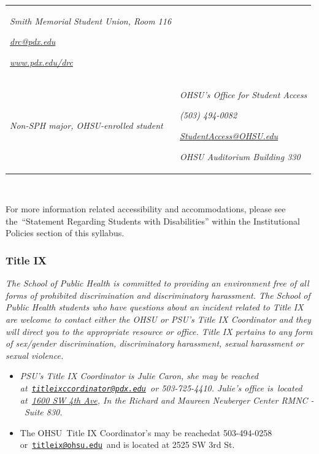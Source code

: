\documentclass[
  letterpaper,
  DIV=11,
  numbers=noendperiod]{scrartcl}
\begin{document}
\begin{longtable}[]{@{}
  >{\raggedright\arraybackslash}p{}
  >{\raggedright\arraybackslash}p{}@{}}
\emph{Smith Memorial Student Union, Room 116}

\href{mailto:drc@pdx.edu}{\emph{drc@pdx.edu}}

\href{http://www.pdx.edu/drc}{\emph{www.pdx.edu/drc}} \\
\emph{Non-SPH major, OHSU-enrolled student} & \emph{OHSU's Office for
Student Access}

\emph{(503) 494-0082}

\href{mailto:StudentAccess@OHSU.edu}{\emph{StudentAccess@OHSU.edu}}

\emph{OHSU Auditorium Building 330} \\
\end{longtable}

~

For more information related accessibility and accommodations, please
see the~``Statement Regarding Students with Disabilities'' within the
Institutional Policies section of this syllabus.

\hypertarget{title-ix}{%
\subsubsection{Title IX}\label{title-ix}}

\emph{The School of Public Health is committed to providing an
environment free of all forms of prohibited discrimination and
discriminatory harassment. The School of Public Health students who have
questions about an incident related to Title IX are welcome to contact
either the OHSU or PSU's Title IX Coordinator and they will direct you
to the appropriate resource or office. Title IX pertains to any form of
sex/gender discrimination, discriminatory harassment, sexual harassment
or sexual violence.}

\begin{itemize}
\item
  \emph{PSU's Title IX Coordinator is Julie Caron, she may be reached
  at~\href{mailto:titleixccordinator@pdx.edu}{\nolinkurl{titleixccordinator@pdx.edu}}~or
  503-725-4410. Julie's office is~located
  at~\href{https://www.google.com/maps/search/1600+SW+4th+Ave?entry=gmail\&source=g}{1600
  SW 4th Ave}, In the Richard and Maureen Neuberger Center RMNC -~Suite
  830.}
\item
  The OHSU~Title IX Coordinator's may be reachedat 503-494-0258
  or~\href{mailto:titleix@ohsu.edu}{\nolinkurl{titleix@ohsu.edu}}~and is
  located at 2525 SW 3rd St.
\end{itemize}
\end{document}
